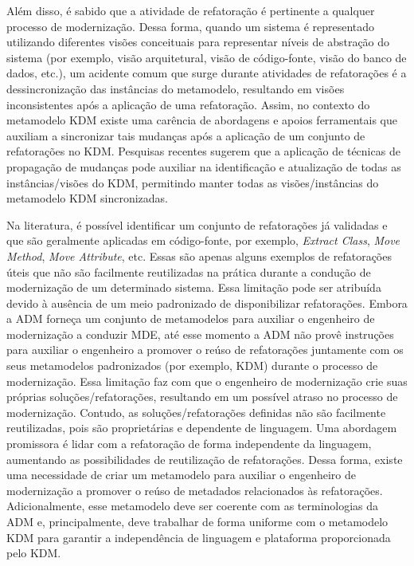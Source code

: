 Além disso, é sabido que a atividade de refatoração é pertinente a qualquer processo de modernização. Dessa forma, quando um sistema é representado utilizando diferentes visões conceituais para representar níveis de abstração do sistema (por exemplo, visão arquitetural, visão de código-fonte, visão do banco de dados, etc.), um acidente comum que surge durante atividades de refatorações é a dessincronização das instâncias do metamodelo, resultando em visões inconsistentes após a aplicação de uma refatoração. Assim, no contexto do metamodelo KDM existe uma carência de abordagens e apoios ferramentais que auxiliam a sincronizar tais mudanças após a aplicação de um conjunto de refatorações no KDM. Pesquisas recentes sugerem que a aplicação de técnicas de propagação de mudanças pode auxiliar na identificação e atualização de todas as instâncias/visões do KDM, permitindo manter todas as visões/instâncias do metamodelo KDM sincronizadas. 

Na literatura, é possível identificar um conjunto de refatorações já validadas e que são geralmente aplicadas em código-fonte, por exemplo, \textit{Extract Class}, \textit{Move Method}, \textit{Move Attribute}, etc. Essas são apenas alguns exemplos de refatorações úteis que não são facilmente reutilizadas na prática durante a condução de modernização de um determinado sistema. Essa limitação pode ser atribuída devido à ausência de um meio padronizado de disponibilizar refatorações. Embora a ADM forneça um conjunto de metamodelos para auxiliar o engenheiro de modernização a conduzir MDE, até esse momento a ADM não provê instruções para auxiliar o engenheiro a promover o reúso de refatorações juntamente com os seus metamodelos padronizados (por exemplo, KDM) durante o processo de modernização. Essa limitação faz com que o engenheiro de modernização crie suas próprias soluções/refatorações, resultando em um possível atraso no processo de modernização. Contudo, as soluções/refatorações definidas não são facilmente reutilizadas, pois são proprietárias e dependente de linguagem. Uma abordagem promissora é lidar com a refatoração de forma independente da linguagem, aumentando as possibilidades de reutilização de refatorações. Dessa forma, existe uma necessidade de criar um metamodelo para auxiliar o engenheiro de modernização a promover o reúso de metadados relacionados às refatorações. Adicionalmente, esse metamodelo deve ser coerente com as terminologias da ADM e, principalmente, deve trabalhar de forma uniforme com o metamodelo KDM para garantir a independência de linguagem e plataforma proporcionada pelo KDM. 

